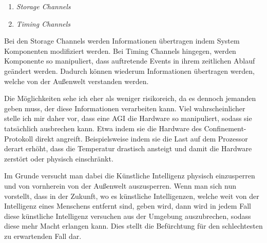         \begin{enumerate}
            \item \textit{Storage Channels}
            \item \textit{Timing Channels}
        \end{enumerate}

        Bei den Storage Channels werden Informationen übertragen indem System Komponenten modifiziert werden. Bei Timing
        Channels hingegen, werden Komponente so manipuliert, dass auftretende Events in ihrem zeitlichen Ablauf geändert
        werden. Dadurch können wiederum Informationen übertragen werden, welche von der Außenwelt verstanden werden.
        \cite[s. 200]{yampolskiy2012leakproofing}

        Die Möglichkeiten sehe ich eher als weniger risikoreich, da es dennoch jemanden geben muss, der diese Informationen
        verarbeiten kann. Viel wahrscheinlicher stelle ich mir daher vor, dass eine AGI die Hardware so manipuliert,
        sodass sie tatsächlich ausbrechen kann. Etwa indem sie die Hardware des Confinement-Protokoll direkt angreift.
        \cite[s. 200]{yampolskiy2012leakproofing} Beispielsweise indem sie die Last auf dem Prozessor derart erhöht,
        dass die Temperatur drastisch ansteigt und damit die Hardware zerstört oder physisch einschränkt.


        Im Grunde versucht man dabei die Künstliche Intelligenz physisch einzusperren und von vornherein von der Außenwelt
        auszusperren. Wenn man sich nun vorstellt, dass in der Zukunft, wo es künstliche Intelligenzen, welche weit von
        der Intelligenz eines Menschens entfernt sind, geben wird, dann wird in jedem Fall diese künstliche Intelligenz
        versuchen aus der Umgebung auszubrechen, sodass diese mehr Macht erlangen kann. Dies stellt die Befürchtung für
        den schlechtesten zu erwartenden Fall dar.\cite{yampolskiy2012leakproofing}


